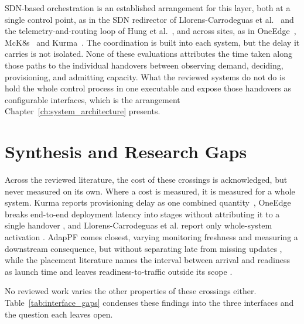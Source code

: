 ﻿\documentclass[12pt,reqno,twoside]{amsbook}
\begin{document}
SDN-based orchestration is an established arrangement for this layer, both at a
single control point, as in the SDN redirector of Llorens-Carrodeguas
et al.~\parencite{Llorens2021SDNBasedHorizontalAutoScalingLoadBalancing} and the
telemetry-and-routing loop of Hung
et al.~\parencite{Hung2022SDNControllerMonitoringArchitecture5G}, and across
sites, as in OneEdge~\parencite{Saurez2021OneEdge}, McK8s~\parencite{Tamiru2021Mck8sOrchestrationPlatformGeoDistributed}
and Kurma~\parencite{Bogdanov2018Kurma}. The coordination is built into each
system, but the delay it carries is not isolated. None of these evaluations
attributes the time taken along those paths to the individual handovers between
observing demand, deciding, provisioning, and admitting capacity. What the reviewed
systems do not do is hold the whole control process in one executable and expose
those handovers as configurable interfaces, which is the arrangement
Chapter~\ref{ch:system_architecture} presents.

\section{Synthesis and Research Gaps}\label{sec:lit_synthesis} %
Across the reviewed literature, the cost of these crossings is acknowledged, but
never measured on its own. Where a cost is measured, it is measured for a whole
system. Kurma reports provisioning delay as one combined
quantity~\parencite{Bogdanov2018Kurma}, OneEdge breaks end-to-end deployment
latency into stages without attributing it to a single handover
\parencite{Saurez2021OneEdge}, and Llorens-Carrodeguas et al. report only
whole-system activation
\parencite{Llorens2021SDNBasedHorizontalAutoScalingLoadBalancing}. AdapPF comes
closest, varying monitoring freshness and measuring a downstream consequence,
but without separating late from missing updates
\parencite{Huang2023AdapPFSelfAdaptiveScrapeInterval}, while the placement
literature names the interval between arrival and readiness as launch time and
leaves readiness-to-traffic outside its scope
\parencite{TabatabaeeMalazi2022DynamicServicePlacementMultiAccess}.

No reviewed work varies the other properties of these crossings either.
Table~\ref{tab:interface_gaps} condenses these findings into the three
interfaces and the question each leaves open.
\end{document}
